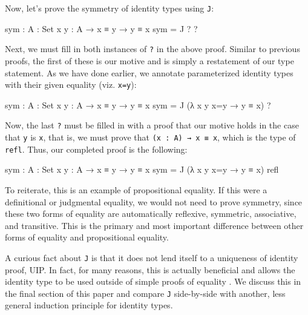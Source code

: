 \documentclass[12pt]{article}
\begin{document}
Now, let's prove the symmetry of identity types using {\tt J}:
\begin{center}
\begin{minipage}{0.9\textwidth}
\begin{code}
sym : {A : Set} {x y : A} → x ≡ y → y ≡ x
sym = J ? ?
\end{code}
\end{minipage}
\end{center}
Next, we must fill in both instances of {\tt ?} in the above proof. Similar to
previous proofs, the first of these is our motive and is simply a restatement of
our type statement. As we have done earlier, we annotate parameterized identity
types with their given equality (viz. {\tt x=y}):
\begin{center}
\begin{minipage}{0.9\textwidth}
\begin{code}
sym : {A : Set} {x y : A} → x ≡ y → y ≡ x
sym = J (λ {x y} x=y → y ≡ x) ?
\end{code}
\end{minipage}
\end{center}
Now, the last {\tt ?} must be filled in with a proof that our motive holds in
the case that {\tt y} is {\tt x}, that is, we must prove that
{\tt (x : A) → x ≡ x}, which is the type of {\tt refl}. Thus, our completed
proof is the following:
\begin{center}
\begin{minipage}{0.9\textwidth}
\begin{code}
sym : {A : Set} {x y : A} → x ≡ y → y ≡ x
sym = J (λ {x y} x=y → y ≡ x) refl
\end{code}
\end{minipage}
\end{center}
To reiterate, this is an example of propositional equality. If this were a
definitional or judgmental equality, we would not need to prove symmetry, since
these two forms of equality are automatically reflexive, symmetric, associative,
and transitive. This is the primary and most important difference between other
forms of equality and propositional equality.

A curious fact about {\tt J} is that it does not lend itself to a uniqueness of
identity proof, UIP. In fact, for many reasons, this is actually beneficial and
allows the identity type to be used outside of simple proofs of equality \cite{}.
We discuss this in the final section of this paper and compare {\tt J}
side-by-side with another, less general induction principle for identity types.
\end{document}
